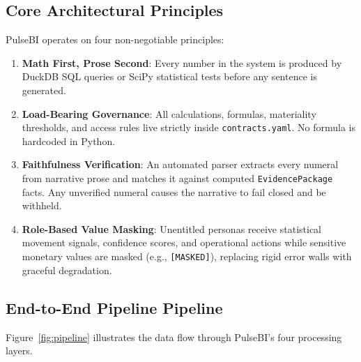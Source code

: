 \documentclass[11pt,a4paper]{article}
\begin{document}
\subsection{Core Architectural Principles}
PulseBI operates on four non-negotiable principles:
\begin{enumerate}
    \item \textbf{Math First, Prose Second}: Every number in the system is produced by DuckDB SQL queries or SciPy statistical tests before any sentence is generated.
    \item \textbf{Load-Bearing Governance}: All calculations, formulas, materiality thresholds, and access rules live strictly inside \texttt{contracts.yaml}. No formula is hardcoded in Python.
    \item \textbf{Faithfulness Verification}: An automated parser extracts every numeral from narrative prose and matches it against computed \texttt{EvidencePackage} facts. Any unverified numeral causes the narrative to fail closed and be withheld.
    \item \textbf{Role-Based Value Masking}: Unentitled personas receive statistical movement signals, confidence scores, and operational actions while sensitive monetary values are masked (e.g., \texttt{[MASKED]}), replacing rigid error walls with graceful degradation.
\end{enumerate}

\subsection{End-to-End Pipeline Pipeline}
Figure~\ref{fig:pipeline} illustrates the data flow through PulseBI's four processing layers.
\end{document}
